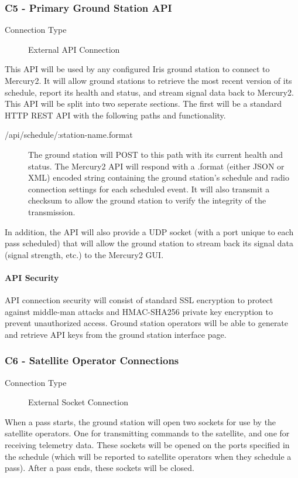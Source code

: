 \documentclass{mxl-note}
\begin{document}
\subsubsection{C5 - Primary Ground Station API}
\begin{description}
	\item [Connection Type] External API Connection
\end{description}
This API will be used by any configured Iris ground station to connect to Mercury2. It will allow ground stations to retrieve the most recent version of its schedule, report its health and status, and stream signal data back to Mercury2. This API will be split into two seperate sections. The first will be a standard HTTP REST API with the following paths and functionality.
\begin{description}
	\item [/api/schedule/:station-name.format] The ground station will POST to this path with its current health and status. The Mercury2 API will respond with a .format (either JSON or XML) encoded string containing the ground station's schedule and radio connection settings for each scheduled event. It will also transmit a checksum to allow the ground station to verify the integrity of the transmission.
\end{description}
In addition, the API will also provide a UDP socket (with a port unique to each pass scheduled) that will allow the ground station to stream back its signal data (signal strength, etc.) to the Mercury2 GUI.

\paragraph{API Security}
API connection security will consist of standard SSL encryption to protect against middle-man attacks and HMAC-SHA256 private key encryption to prevent unauthorized access. Ground station operators will be able to generate and retrieve API keys from the ground station interface page.

\subsubsection{C6 - Satellite Operator Connections}
\begin{description}
	\item [Connection Type] External Socket Connection
\end{description}
When a pass starts, the ground station will open two sockets for use by the satellite operators. One for transmitting commands to the satellite, and one for receiving telemetry data. These sockets will be opened on the ports specified in the schedule (which will be reported to satellite operators when they schedule a pass). After a pass ends, these sockets will be closed.
\end{document}
